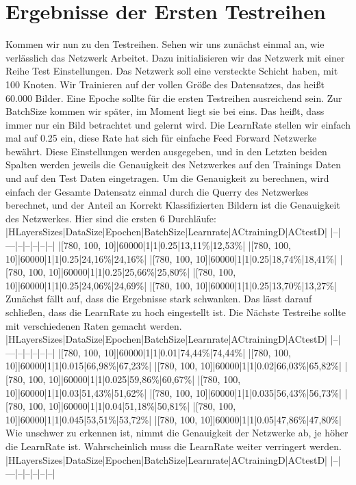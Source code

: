 \documentclass[12pt]{article}
\begin{document}
\section{ Ergebnisse der Ersten Testreihen}
Kommen wir nun zu den Testreihen. Sehen wir uns zunächst einmal an, wie verlässlich das Netzwerk Arbeitet. Dazu initialisieren wir das Netzwerk mit einer Reihe Test Einstellungen. Das Netzwerk soll eine versteckte Schicht haben, mit 100 Knoten. Wir Trainieren auf der vollen Größe des Datensatzes, das heißt 60.000 Bilder. Eine Epoche sollte für die ersten Testreihen ausreichend sein. Zur BatchSize kommen wir später, im Moment liegt sie bei eins. Das heißt, dass immer nur ein Bild betrachtet und gelernt wird. Die LearnRate stellen wir einfach mal auf 0.25 ein, diese Rate hat sich für einfache Feed Forward Netzwerke bewährt. Diese Einstellungen werden ausgegeben, und in den Letzten beiden Spalten werden jeweils die Genauigkeit des Netzwerkes auf den Trainings Daten und auf den Test Daten eingetragen. Um die Genauigkeit zu berechnen, wird einfach der Gesamte Datensatz einmal durch die Querry des Netzwerkes berechnet, und der Anteil an Korrekt Klassifizierten Bildern ist die Genauigkeit des Netzwerkes.
Hier sind die ersten 6 Durchläufe:
|HLayersSizes|DataSize|Epochen|BatchSize|Learnrate|ACtrainingD|ACtestD|
|--|---|--|--|--|--|--|
|[780, 100, 10]|60000|1|1|0.25|13,11\%|12,53\%|
|[780, 100, 10]|60000|1|1|0.25|24,16\%|24,16\%|
|[780, 100, 10]|60000|1|1|0.25|18,74\%|18,41\%|
|[780, 100, 10]|60000|1|1|0.25|25,66\%|25,80\%|
|[780, 100, 10]|60000|1|1|0.25|24,06\%|24,69\%|
|[780, 100, 10]|60000|1|1|0.25|13,70\%|13,27\%|
Zunächst fällt auf, dass die Ergebnisse stark schwanken. Das lässt darauf schließen, dass die LearnRate zu hoch eingestellt ist. Die Nächste Testreihe sollte mit verschiedenen Raten gemacht werden.
|HLayersSizes|DataSize|Epochen|BatchSize|Learnrate|ACtrainingD|ACtestD|
|--|---|--|--|--|--|--|
|[780, 100, 10]|60000|1|1|0.01|74,44\%|74,44\%|
|[780, 100, 10]|60000|1|1|0.015|66,98\%|67,23\%|
|[780, 100, 10]|60000|1|1|0.02|66,03\%|65,82\%|
|[780, 100, 10]|60000|1|1|0.025|59,86\%|60,67\%|
|[780, 100, 10]|60000|1|1|0.03|51,43\%|51,62\%|
|[780, 100, 10]|60000|1|1|0.035|56,43\%|56,73\%|
|[780, 100, 10]|60000|1|1|0.04|51,18\%|50,81\%|
|[780, 100, 10]|60000|1|1|0.045|53,51\%|53,72\%|
|[780, 100, 10]|60000|1|1|0.05|47,86\%|47,80\%|
	Wie unschwer zu erkennen ist, nimmt die Genauigkeit der Netzwerke ab, je höher die LearnRate ist. Wahrscheinlich muss die LearnRate weiter verringert werden.
|HLayersSizes|DataSize|Epochen|BatchSize|Learnrate|ACtrainingD|ACtestD|		
|--|---|--|--|--|--|--|
\end{document}
